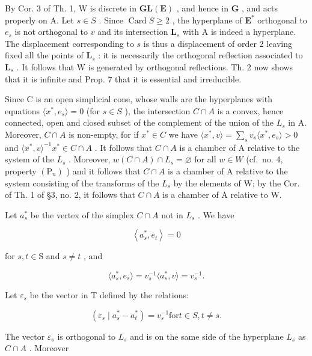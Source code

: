 By Cor. 3 of Th. 1, W is discrete in \(\mathbf{GL}(\mathbf{E})\) , and hence in \(\mathbf{G}\) , and acts properly on A. Let \(s \in S\) . Since \(\operatorname{Card} S \geqslant 2\) , the hyperplane of \(\mathbf{E}^*\) orthogonal to \(e_s\) is not orthogonal to \(v\) and its intersection \(\mathbf{L}_s\) with A is indeed a hyperplane. The displacement corresponding to \(s\) is thus a displacement of order 2 leaving fixed all the points of \(\mathbf{L}_s\) : it is necessarily the orthogonal reflection associated to \(\mathbf{L}_s\) . It follows that W is generated by orthogonal reflections. Th. 2 now shows that it is infinite and Prop. 7 that it is essential and irreducible.

Since C is an open simplicial cone, whose walls are the hyperplanes with equations \(\langle x^{*}, e_{s} \rangle = 0\) (for \(s \in S\) ), the intersection \(C \cap A\) is a convex, hence connected, open and closed subset of the complement of the union of the \(L_{s}\) in A. Moreover, \(C \cap A\) is non-empty, for if \(x^{*} \in C\) we have \(\langle x^{*}, v \rangle = \sum_{s} v_{s} \langle x^{*}, e_{s} \rangle > 0\) and \(\langle x^{*}, v \rangle^{-1} x^{*} \in C \cap A\) . It follows that \(C \cap A\) is a chamber of A relative to the system of the \(L_{s}\) . Moreover, \(w(C \cap A) \cap L_{s} = \varnothing\) for all \(w \in W\) (cf.~no. 4, property \((\mathrm{P}_{n})\) ) and it follows that \(C \cap A\) is a chamber of A relative to the system consisting of the transforms of the \(L_{s}\) by the elements of W; by the Cor. of Th. 1 of §3, no. 2, it follows that \(C \cap A\) is a chamber of A relative to W.

Let \(a_{s}^{*}\) be the vertex of the simplex \(C \cap A\) not in \(L_{s}\) . We have

\[
\left\langle a _ {s} ^ {*}, e _ {t} \right\rangle = 0
\]

for \(s,t\in \mathrm{S}\) and \(s\neq t\) , and

\[
\langle a _ {s} ^ {*}, e _ {s} \rangle = v _ {s} ^ {- 1} \langle a _ {s} ^ {*}, v \rangle = v _ {s} ^ {- 1}.
\]

Let \(\varepsilon_{s}\) be the vector in T defined by the relations:

\[
\left(\varepsilon_ {s} \mid a _ {s} ^ {*} - a _ {t} ^ {*}\right) = v _ {s} ^ {- 1} \text {for} t \in S, t \neq s.
\]

The vector \(\varepsilon_{s}\) is orthogonal to \(L_{s}\) and is on the same side of the hyperplane \(L_{s}\) as \(C \cap A\) . Moreover

